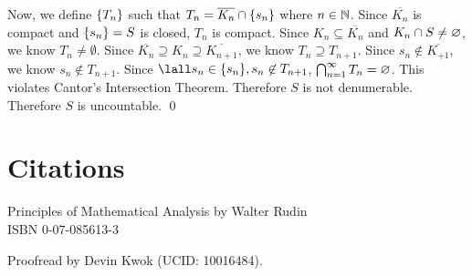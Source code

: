 \documentclass[10pt, letterpaper, titlepage]{article}
\begin{document}
      Now, we define $\{ T_n \}$ such that 
      $T_n = \overline{K_n} \cap \{ s_n \}$ where $n \in \mathbb{N}$. 
      Since $\overline{K_n}$ is compact 
      and $\{ s_n \} = S$ is closed,
      $T_n$ is compact.
      Since $K_n \subseteq \overline{K_n}$
      and $K_n \cap S \neq \varnothing$,
      we know $T_n \neq \emptyset$.
      Since $\overline{K_n} \supseteq K_n \supseteq \overline{K_{n+1}}$,
      we know $T_n \supseteq T_{n+1}$.
      Since $s_n \not\in \overline{K_{+1}}$,
      we know $s_{n} \not\in T_{n+1}$.
      Since $\lall s_n \in \set{s_n}, s_n \not\in T_{n+1}$,
      $\bigcap_{n=1}^{\infty} T_n = \varnothing$.
      This violates Cantor's Intersection Theorem.
      Therefore $S$ is not denumerable.
      Therefore $S$ is uncountable.
      \qed

    \section*{Citations}
    Principles of Mathematical Analysis by Walter Rudin \\ 
    ISBN 0-07-085613-3

    Proofread by Devin Kwok (UCID: 10016484).



\end{document}
